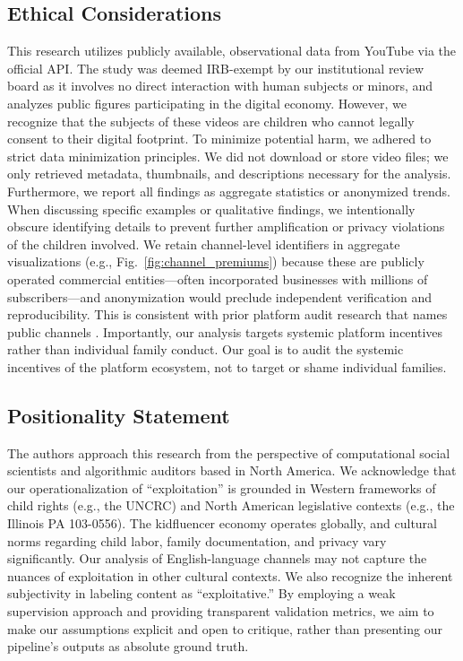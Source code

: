 \documentclass[]{ieeeaccess}
\begin{document}
\subsection{Ethical Considerations}
This research utilizes publicly available, observational data from YouTube via the official API. The study was deemed IRB-exempt by our institutional review board as it involves no direct interaction with human subjects or minors, and analyzes public figures participating in the digital economy. However, we recognize that the subjects of these videos are children who cannot legally consent to their digital footprint. To minimize potential harm, we adhered to strict data minimization principles. We did not download or store video files; we only retrieved metadata, thumbnails, and descriptions necessary for the analysis. Furthermore, we report all findings as aggregate statistics or anonymized trends. When discussing specific examples or qualitative findings, we intentionally obscure identifying details to prevent further amplification or privacy violations of the children involved. We retain channel-level identifiers in aggregate visualizations (e.g., Fig.~\ref{fig:channel_premiums}) because these are publicly operated commercial entities---often incorporated businesses with millions of subscribers---and anonymization would preclude independent verification and reproducibility. This is consistent with prior platform audit research that names public channels \cite{papadamou2020disturbed,habib2025auditing}. Importantly, our analysis targets systemic platform incentives rather than individual family conduct. Our goal is to audit the systemic incentives of the platform ecosystem, not to target or shame individual families.

\subsection{Positionality Statement}
The authors approach this research from the perspective of computational social scientists and algorithmic auditors based in North America. We acknowledge that our operationalization of ``exploitation'' is grounded in Western frameworks of child rights (e.g., the UNCRC) and North American legislative contexts (e.g., the Illinois PA 103-0556). The kidfluencer economy operates globally, and cultural norms regarding child labor, family documentation, and privacy vary significantly. Our analysis of English-language channels may not capture the nuances of exploitation in other cultural contexts. We also recognize the inherent subjectivity in labeling content as ``exploitative.'' By employing a weak supervision approach and providing transparent validation metrics, we aim to make our assumptions explicit and open to critique, rather than presenting our pipeline's outputs as absolute ground truth.
\end{document}
